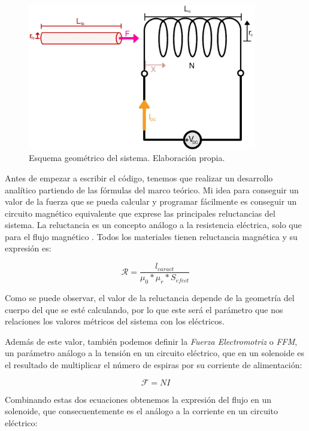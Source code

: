 \begin{figure}[H]
    \centering
    \includegraphics[width=10cm]{FigurasMemoria/esquemaDesTeor.jpg}
    \caption{Esquema geométrico del sistema. Elaboración propia.}
    \label{fig:esquemaDesTeor} %
\end{figure}

Antes de empezar a escribir el código, tenemos que realizar un desarrollo analítico partiendo de las fórmulas del marco teórico. Mi idea para conseguir un valor de la fuerza que se pueda calcular y programar fácilmente es conseguir un circuito magnético equivalente que exprese las principales reluctancias del sistema. La reluctancia es un concepto análogo a la resistencia eléctrica, solo que para el flujo magnético \citep{hughes2005electrical}. Todos los materiales tienen reluctancia magnética y su expresión es:

\begin{center}
    \[\mathcal{R} = \frac{l_{caract}}{\mu_0*\mu_r*S_{efect}}\]
\end{center}

Como se puede observar, el valor de la reluctancia depende de la geometría del cuerpo del que se esté calculando, por lo que este será el parámetro que nos relaciones los valores métricos del sistema con los eléctricos.

Además de este valor, también podemos definir la \textit{Fuerza Electromotriz} o \textit{FFM}, un parámetro análogo a la tensión en un circuito eléctrico, que en un solenoide es el resultado de multiplicar el número de espiras por su corriente de alimentación:

\begin{center}
    \[\mathcal{F}=NI\]
\end{center}

Combinando estas dos ecuaciones obtenemos la expresión del flujo en un solenoide, que consecuentemente es el análogo a la corriente en un circuito eléctrico:

